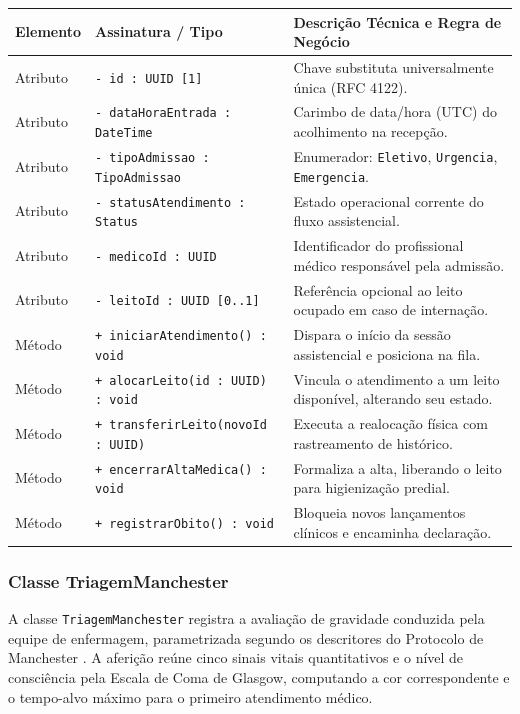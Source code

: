 \begingroup
\small
\noindent\begin{tabularx}{\linewidth}{l >{\raggedright\arraybackslash}p{5.7cm} >{\raggedright\arraybackslash}X}
\toprule
\textbf{Elemento} & \textbf{Assinatura / Tipo} & \textbf{Descrição Técnica e Regra de Negócio} \\
\midrule
Atributo & \texttt{- id : UUID [1]} & Chave substituta universalmente única (RFC 4122). \\
Atributo & \texttt{- dataHoraEntrada : DateTime} & Carimbo de data/hora (UTC) do acolhimento na recepção. \\
Atributo & \texttt{- tipoAdmissao : TipoAdmissao} & Enumerador: \texttt{Eletivo}, \texttt{Urgencia}, \texttt{Emergencia}. \\
Atributo & \texttt{- statusAtendimento : Status} & Estado operacional corrente do fluxo assistencial. \\
Atributo & \texttt{- medicoId : UUID} & Identificador do profissional médico responsável pela admissão. \\
Atributo & \texttt{- leitoId : UUID [0..1]} & Referência opcional ao leito ocupado em caso de internação. \\
\midrule
Método & \texttt{+ iniciarAtendimento() : void} & Dispara o início da sessão assistencial e posiciona na fila. \\
Método & \texttt{+ alocarLeito(id : UUID) : void} & Vincula o atendimento a um leito disponível, alterando seu estado. \\
Método & \texttt{+ transferirLeito(novoId : UUID)} & Executa a realocação física com rastreamento de histórico. \\
Método & \texttt{+ encerrarAltaMedica() : void} & Formaliza a alta, liberando o leito para higienização predial. \\
Método & \texttt{+ registrarObito() : void} & Bloqueia novos lançamentos clínicos e encaminha declaração. \\
\bottomrule
\end{tabularx}
\endgroup

\subsubsection{Classe TriagemManchester}
A classe \texttt{TriagemManchester} registra a avaliação de gravidade conduzida pela equipe de enfermagem, parametrizada segundo os descritores do Protocolo de Manchester \cite{manchester:2014}. A aferição reúne cinco sinais vitais quantitativos e o nível de consciência pela Escala de Coma de Glasgow, computando a cor correspondente e o tempo-alvo máximo para o primeiro atendimento médico.

